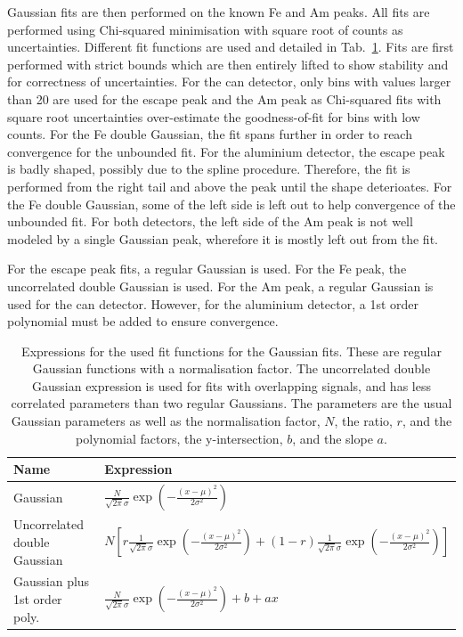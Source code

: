 Gaussian fits are then performed on the known Fe and Am peaks. All fits are performed using Chi-squared minimisation with square root of counts as uncertainties. Different fit functions are used and detailed in Tab.~\ref{tab:fitfuncchannelfits}. Fits are first performed with strict bounds which are then entirely lifted to show stability and for correctness of uncertainties. For the can detector, only bins with values larger than 20 are used for the escape peak and the Am peak as Chi-squared fits with square root uncertainties over-estimate the goodness-of-fit for bins with low counts. For the Fe double Gaussian, the fit spans further in order to reach convergence for the unbounded fit. For the aluminium detector, the escape peak is badly shaped, possibly due to the spline procedure. Therefore, the fit is performed from the right tail and above the peak until the shape deterioates. For the Fe double Gaussian, some of the left side is left out to help convergence of the unbounded fit. For both detectors, the left side of the Am peak is not well modeled by a single Gaussian peak, wherefore it is mostly left out from the fit.

For the escape peak fits, a regular Gaussian is used. For the Fe peak, the uncorrelated double Gaussian is used. For the Am peak, a regular Gaussian is used for the can detector. However, for the aluminium detector, a 1st order polynomial must be added to ensure convergence.

\begin{table}[htb]
  \centering
\begin{tabular}{ll}
\textbf{Name}                 & \textbf{Expression} \\ \hline
Gaussian                      & $\frac{N}{\sqrt{2\pi}\sigma}\exp{\left(-\frac{\left(x-\mu\right)^2}{2\sigma^2}\right)}$                    \\
Uncorrelated double Gaussian  & $N\left[r\frac{1}{\sqrt{2\pi}\sigma}\exp{\left(-\frac{\left(x-\mu\right)^2}{2\sigma^2}\right)}+(1-r)\frac{1}{\sqrt{2\pi}\sigma}\exp{\left(-\frac{\left(x-\mu\right)^2}{2\sigma^2}\right)}\right]$                     \\
Gaussian plus 1st order poly. & $\frac{N}{\sqrt{2\pi}\sigma}\exp{\left(-\frac{\left(x-\mu\right)^2}{2\sigma^2}\right)} + b + ax$                   
\end{tabular}
\caption{Expressions for the used fit functions for the Gaussian fits. These are regular Gaussian functions with a normalisation factor. The uncorrelated double Gaussian expression is used for fits with overlapping signals, and has less correlated parameters than two regular Gaussians. The parameters are the usual Gaussian parameters as well as the normalisation factor, $N$, the ratio, $r$, and the polynomial factors, the y-intersection, $b$, and the slope $a$.}
\label{tab:fitfuncchannelfits}
\end{table}

